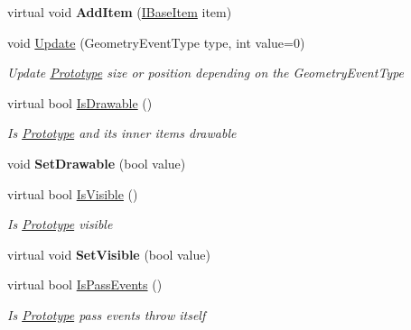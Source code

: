 \begin{DoxyCompactItemize}
\mbox{\label{class_space_v_i_l_1_1_prototype_a1f83ea1b5c34b4fdcb67afab217ae8bc}} 
virtual void {\bfseries Add\+Item} (\mbox{\hyperlink{interface_space_v_i_l_1_1_core_1_1_i_base_item}{I\+Base\+Item}} item)
\item 
void \mbox{\hyperlink{class_space_v_i_l_1_1_prototype_a04c59a65bf5d4b493b925fd86c69b5ff}{Update}} (Geometry\+Event\+Type type, int value=0)
\begin{DoxyCompactList}\small\item\em Update \mbox{\hyperlink{class_space_v_i_l_1_1_prototype}{Prototype}} size or position depending on the Geometry\+Event\+Type \end{DoxyCompactList}\item 
virtual bool \mbox{\hyperlink{class_space_v_i_l_1_1_prototype_a5e0af4f19ec991534e4cb5fdbe876af2}{Is\+Drawable}} ()
\begin{DoxyCompactList}\small\item\em Is \mbox{\hyperlink{class_space_v_i_l_1_1_prototype}{Prototype}} and its inner items drawable \end{DoxyCompactList}\item 
\mbox{\label{class_space_v_i_l_1_1_prototype_a0b002bebe29d3f014a5af100885c7f49}} 
void {\bfseries Set\+Drawable} (bool value)
\item 
virtual bool \mbox{\hyperlink{class_space_v_i_l_1_1_prototype_a852c3d3cd17417589ddb85c0cd99d26e}{Is\+Visible}} ()
\begin{DoxyCompactList}\small\item\em Is \mbox{\hyperlink{class_space_v_i_l_1_1_prototype}{Prototype}} visible \end{DoxyCompactList}\item 
\mbox{\label{class_space_v_i_l_1_1_prototype_accbd8c32a27fa17ade8b9348f58b1b5e}} 
virtual void {\bfseries Set\+Visible} (bool value)
\item 
virtual bool \mbox{\hyperlink{class_space_v_i_l_1_1_prototype_af78de74eef048beb5a5af4b36e0ba39e}{Is\+Pass\+Events}} ()
\begin{DoxyCompactList}\small\item\em Is \mbox{\hyperlink{class_space_v_i_l_1_1_prototype}{Prototype}} pass events throw itself \end{DoxyCompactList}\item 

\end{DoxyCompactItemize}
